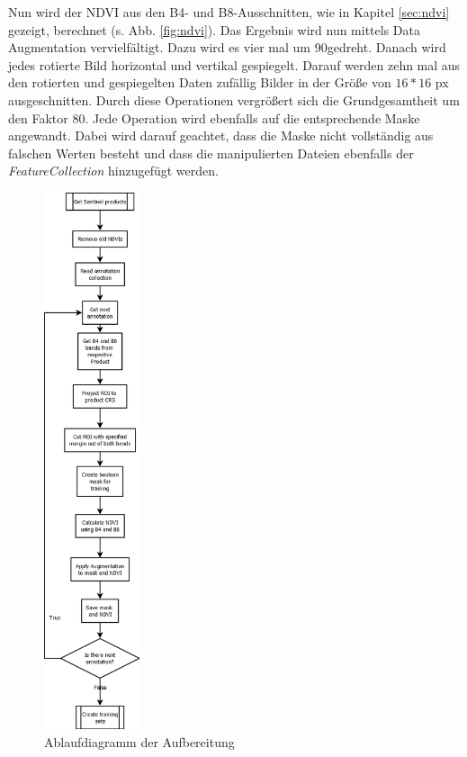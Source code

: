 \noindent
Nun wird der NDVI aus den B4- und B8-Ausschnitten, wie in Kapitel \ref{sec:ndvi} gezeigt, berechnet (s. Abb. \ref{fig:ndvi}). Das Ergebnis wird nun mittels Data Augmentation vervielfältigt. Dazu wird es vier mal um 90\degree gedreht. Danach wird jedes rotierte Bild horizontal und vertikal gespiegelt. Darauf werden zehn mal aus den rotierten und gespiegelten Daten zufällig Bilder in der Größe von $16*16$ px ausgeschnitten. Durch diese Operationen vergrößert sich die Grundgesamtheit um den Faktor 80. Jede Operation wird ebenfalls auf die entsprechende Maske angewandt. Dabei wird darauf geachtet, dass die Maske nicht vollständig aus falschen Werten besteht und dass die manipulierten Dateien ebenfalls der \textit{FeatureCollection} hinzugefügt werden.

\begin{figure}[ht]
  \centering
  \includegraphics[height=0.6\textheight,width=0.25\textwidth]{pics/create-ndvi.png}
  \caption{Ablaufdiagramm der Aufbereitung}
  \label{fig:create-ndvi}
\end{figure}


